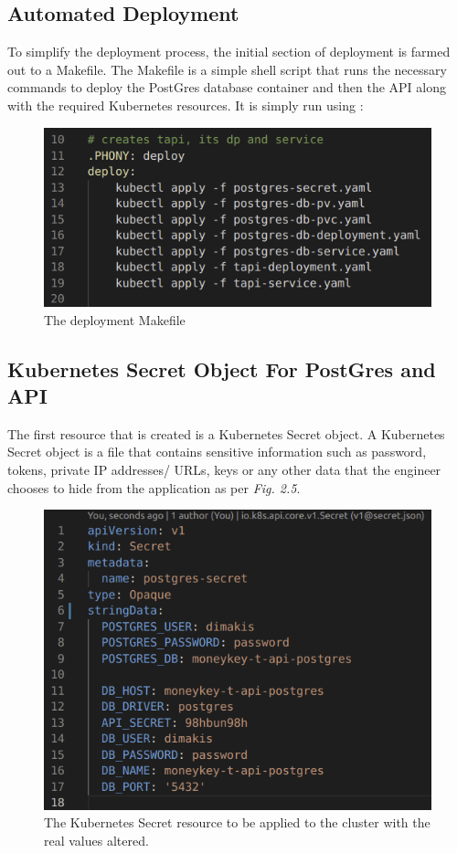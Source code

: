 \begin{flushleft}
    \subsection{Automated Deployment}
    To simplify the deployment process, the initial section of deployment is farmed out to a Makefile. The Makefile is a simple shell script that runs the necessary commands to
    deploy the PostGres database container and then the API along with the required Kubernetes resources. It is simply run using : \newline
    \begin{figure} [ht]
        \begin{center}
            \includegraphics[width=.8\textwidth]{figures/deployment-makefile.png}
            \caption{The deployment Makefile}
            \label{fig: 2.4}
        \end{center}
    \end{figure}
    \pagebreak
    \subsection{Kubernetes Secret Object For PostGres and API}
    The first resource that is created is a Kubernetes Secret object. A Kubernetes Secret object is a file that contains sensitive information such as password, tokens, private
    IP addresses/ URLs, keys or any other data that the engineer chooses to hide from the application \autocite{Secrets} as per \emph{Fig. 2.5}.
    \begin{figure} [ht]
        \begin{center}
            \includegraphics[width=.6\textwidth]{figures/deployment-secret.png}
            \caption{The Kubernetes Secret resource to be applied to the cluster with the real values altered.}
            \label{fig: 2.5}


\end{center}
\end{figure}
\end{flushleft}
